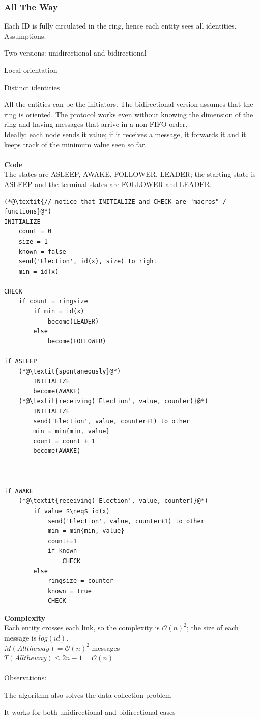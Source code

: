 \documentclass[paper=a4, fontsize=11pt]{scrartcl} %
\numberwithin{equation}{section} %
\numberwithin{figure}{section} %
\numberwithin{table}{section} %
\begin{document}
\subsubsection*{All The Way}
Each ID is fully circulated in the ring, hence each entity sees all identities.
\\
Assumptions:
\begin{compactitem}
\item Two versions: unidirectional and bidirectional
\item Local orientation
\item Distinct identities
\end{compactitem}
All the entities can be the initiators. The bidirectional version assumes that the ring is oriented. The protocol works even without knowing the dimension of the ring and having messages that arrive in a non-FIFO order. \\ 
Ideally: each node sends it value; if it receives a message, it forwards it and it keeps track of the minimum value seen so far.\\ \\
\textbf{Code}\\The states are ASLEEP, AWAKE, FOLLOWER, LEADER; the starting state is ASLEEP and the terminal states are FOLLOWER and LEADER. 
\begin{lstlisting}
(*@\textit{// notice that INITIALIZE and CHECK are "macros" / functions}@*)
INITIALIZE
	count = 0
	size = 1
	known = false
	send('Election', id(x), size) to right
	min = id(x)

CHECK
	if count = ringsize
		if min = id(x)
			become(LEADER)
		else
			become(FOLLOWER)										

if ASLEEP
	(*@\textit{spontaneously}@*)
		INITIALIZE
		become(AWAKE)
	(*@\textit{receiving('Election', value, counter)}@*)
		INITIALIZE
		send('Election', value, counter+1) to other
		min = min{min, value}
		count = count + 1
		become(AWAKE)



if AWAKE
	(*@\textit{receiving('Election', value, counter)}@*)
		if value $\neq$ id(x)
			send('Election', value, counter+1) to other
			min = min{min, value}
			count+=1
			if known 
				CHECK
		else
			ringsize = counter
			known = true
			CHECK
\end{lstlisting}
\textbf{Complexity}\\
Each entity crosses each link, so the complexity is $\mathcal{O}(n)^2$; the size of each message is $log(id)$.\\
$M(Alltheway) =\mathcal{O}(n)^2$ messages \\
$T(Alltheway) \leq 2n-1 = \mathcal{O}(n)$ \\ \\
Observations:
\begin{compactitem}
\item The algorithm also solves the data collection problem
\item It works for both unidirectional and bidirectional cases
\end{compactitem}
~ \\
\end{document}
